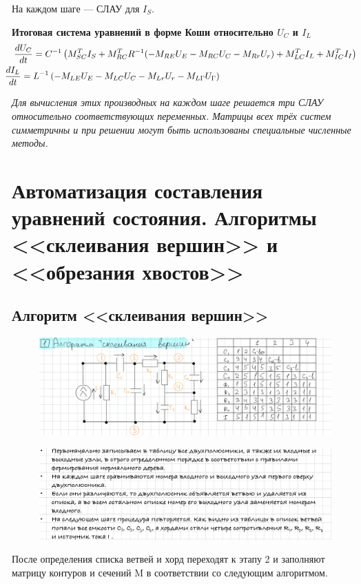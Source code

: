 	На каждом шаге — СЛАУ для $I_S$.
	
	\textbf{Итоговая система уравнений в форме Коши относительно $U_C$ и $I_L$}
	\vspace{-0.5em}
	\begin{equation}
		\begin{aligned}
			&\frac{dU_C}{dt} = C^{-1}\left(M_{SC}^T I_S + M_{RC}^T R^{-1} (-M_{RE} U_E - M_{RC} U_C - M_{Rr} U_r) + M_{LC}^T I_L + M_{IC}^T I_I\right) \nonumber\\
			&\hspace{-1em}\frac{dI_L}{dt} = L^{-1}\left(-M_{LE} U_E - M_{LC} U_C - M_{Lr} U_r - M_{L\Gamma} U_{\Gamma}\right)
		\end{aligned}
	\end{equation}
	
	\vspace{1em}
	\noindent\textit{Для вычисления этих производных на каждом шаге решается три СЛАУ относительно соответствующих переменных. Матрицы всех трёх систем симметричны и при решении могут быть использованы специальные численные методы.}
	
	\newpage
	
	\section{Автоматизация составления уравнений состояния. Алгоритмы <<склеивания вершин>> и <<обрезания хвостов>>}
	
	\subsection{Алгоритм <<склеивания вершин>>}
	
	\begin{figure}[H]
		\centering
		\includegraphics[width=1\linewidth, height=0.2\textheight]{img/25_01}
		\label{fig:25_01}
	\end{figure}
	\vspace{-2em}
	\begin{figure}[H]
		\centering
		\includegraphics[width=1\linewidth, height=0.2\textheight]{img/25_02}
		\label{fig:25_02}
	\end{figure}
	\vspace{-2em}
	После определения списка ветвей и хорд переходят к этапу 2 и заполняют матрицу 
	контуров и сечений M в соответствии со следующим алгоритмом.
	
